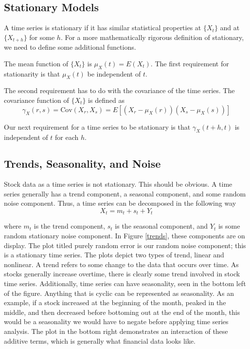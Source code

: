 \documentclass[12pt]{article}
\begin{document}
\subsection{Stationary Models}  
A time series is stationary if it has similar statistical properties at $\{X_t\}$ and at $\{X_{t+h}\}$ for some $h$. For a more mathematically rigorous definition of stationary, we need to define some additional functions.

The mean function of $\{X_t\}$ is $\mu_X(t) = E(X_t)$. The first requirement for stationarity is that $\mu_X(t)$ be independent of $t$. 

The second requirement has to do with the covariance of the time series. The covariance function of $\{X_t\}$ is defined as
$$\gamma _X(r,s) = \text{Cov}(X_r, X_s) = E[(X_r - \mu _X(r))(X_s - \mu_X(s))]$$

Our next requirement for a time series to be stationary is that $\gamma_X(t+h, t)$ is independent of $t$ for each $h$. 

\subsection{Trends, Seasonality, and Noise}
Stock data as a time series is not stationary. This should be obvious. A time series generally has a trend component, a seasonal component, and some random noise component. Thus, a time series can be decomposed in the following way
$$X_t = m_t + s_t + Y_t$$

where $m_t$ is the trend component, $s_t$ is the seasonal component, and $Y_t$ is some random stationary noise component. In Figure \ref{trends}, these components are on display. The plot titled purely random error is our random noise component; this is a stationary time series. The plots depict two types of trend, linear and nonlinear. A trend refers to some change to the data that occurs over time. As stocks generally increase overtime, there is clearly some trend involved in stock time series. Additionally, time series can have seasonality, seen in the bottom left of the figure. Anything that is cyclic can be represented as seasonality. As an example, if a stock increased at the beginning of the month, peaked in the middle, and then decreased before bottoming out at the end of the month, this would be a seasonality we would have to negate before applying time series analysis. The plot in the bottom right demonstrates an interaction of these additive terms, which is generally what financial data looks like. \cite[22]{timeseries}
\end{document}
